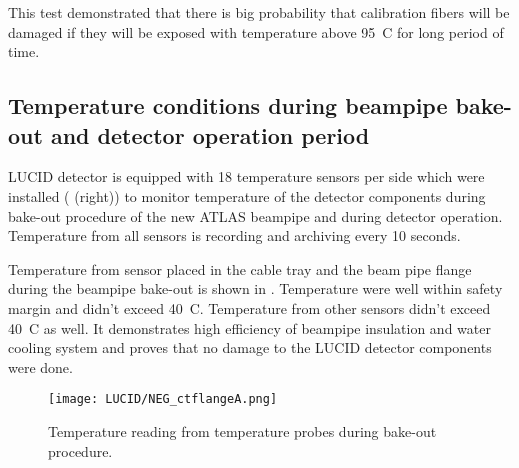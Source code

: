 This test demonstrated that there is big probability that calibration fibers will be damaged if they will be exposed 
with temperature above 95\degree~C for long period of time.

% 
% 

 
\subsection{Temperature conditions during beampipe bake-out and detector operation period}

LUCID detector is equipped with 18 temperature sensors per side which were installed ( (right))
to monitor temperature of the detector components during bake-out procedure of the new ATLAS beampipe and during detector operation.
Temperature from all sensors is recording and archiving every 10 seconds.

Temperature from sensor placed in the cable tray and the beam pipe flange during the beampipe bake-out is shown in .
Temperature were well within safety margin and didn't exceed 40\degree~C. Temperature from other sensors didn't exceed 40\degree~C as well.
It demonstrates high efficiency of beampipe insulation and water cooling system and proves that no damage to the LUCID detector components were done.

\begin{figure}
\centering
\texttt{[image: LUCID/NEG\_ctflangeA.png]}
\caption{Temperature reading from temperature probes during bake-out procedure.}
\label{fig:NEG_ctflangeA}
\end{figure}
 

